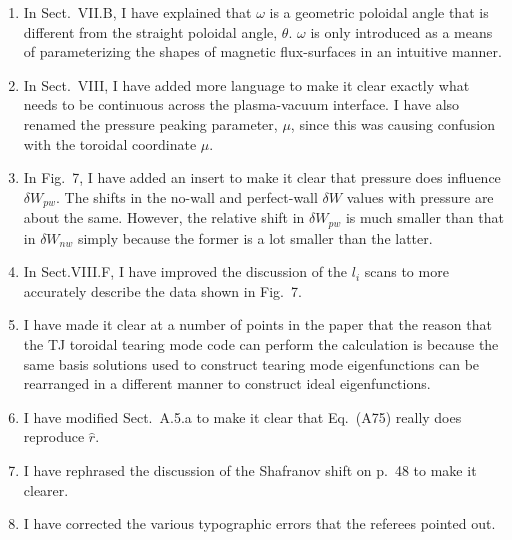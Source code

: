 \documentclass{article}[12pt]
\begin{document}
\begin{enumerate}
\item In Sect.~VII.B, I have explained that $\omega$ is a geometric poloidal angle that is different from the straight poloidal angle, $\theta$.
$\omega$ is only introduced as a means of parameterizing the shapes of magnetic flux-surfaces in an intuitive manner.

\item In Sect.~VIII, I have added more language to make it clear exactly what needs to be continuous across the plasma-vacuum interface.
I have also renamed the pressure peaking parameter, $\mu$, since this was causing confusion with the toroidal coordinate $\mu$. 

\item In Fig.~7, I have added an insert to make it clear that pressure does influence $\delta W_{pw}$. The shifts in the 
no-wall and perfect-wall $\delta W$ values with pressure are about the same. However, the relative shift in $\delta W_{pw}$ is much
smaller than that in $\delta W_{nw}$ simply because the former is a lot smaller than the latter. 

\item In Sect.VIII.F, I have improved the discussion of the $l_i$ scans to more accurately describe the data shown in Fig.~7.

\item I have made it clear at a number of points in the paper that the reason that the TJ toroidal tearing mode code can perform the
calculation is because the same basis solutions used to construct tearing mode eigenfunctions can be rearranged in a different manner to
construct ideal eigenfunctions. 

\item I have modified Sect.~A.5.a to make it clear that Eq.~(A75) really does reproduce $\hat{r}$. 

\item I have rephrased the discussion of the Shafranov shift on p.~48 to make it clearer.

\item I have corrected the various typographic errors that the referees pointed out. 

\end{enumerate}
\end{document}
